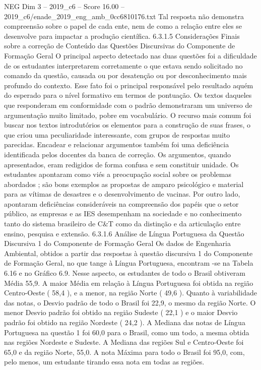 \begin{textsample}{NEG Dim 3 – 2019\_c6 – Score 16.00 – 2019\_c6/enade\_2019\_eng\_amb\_0cc6810176.txt}
Tal resposta não demonstra compreensão sobre o papel de cada ente, nem de como a relação entre eles se desenvolve para impactar a produção científica. 6.3.1.5 Considerações Finais sobre a correção de Conteúdo das Questões Discursivas do Componente de Formação Geral O principal aspecto detectado nas duas questões foi a dificuldade de os estudantes interpretarem corretamente o que estava sendo solicitado no comando da questão, causada ou por desatenção ou por desconhecimento mais profundo do contexto.
Esse fato foi o principal responsável pelo resultado aquém do esperado para o nível formativo em termos de pontuação.
Os textos daqueles que responderam em conformidade com o padrão demonstraram um universo de argumentação muito limitado, pobre em vocabulário.
O recurso mais comum foi buscar nos textos introdutórios os elementos para a construção de suas frases, o que criou uma peculiaridade interessante, com grupos de respostas muito parecidas.
Encadear e relacionar argumentos também foi uma deficiência identificada pelos docentes da banca de correção.
Os argumentos, quando apresentados, eram redigidos de forma confusa e sem constituir unidade.
Os estudantes apontaram como viés a preocupação social sobre os problemas abordados ; são bons exemplos as propostas de amparo psicológico e material para as vítimas de desastres e o desenvolvimento de vacinas.
Por outro lado, apontaram deficiências consideráveis na compreensão dos papéis que o setor público, as empresas e as IES desempenham na sociedade e no conhecimento tanto do sistema brasileiro de C\&T como da distinção e da articulação entre ensino, pesquisa e extensão. 6.3.1.6 Análise de Língua Portuguesa da Questão Discursiva 1 do Componente de Formação Geral Os dados de Engenharia Ambiental, obtidos a partir das respostas à questão discursiva 1 do Componente de Formação Geral, no que tange à Língua Portuguesa, encontram -se na Tabela 6.16 e no Gráfico 6.9.
Nesse aspecto, os estudantes de todo o Brasil obtiveram Média 55,9.
A maior Média em relação à Língua Portuguesa foi obtida na região Centro-Oeste ( 58,4 ), e a menor, na região Norte ( 49,6 ).
Quanto à variabilidade das notas, o Desvio padrão de todo o Brasil foi 22,9, o mesmo da região Norte.
O menor Desvio padrão foi obtido na região Sudeste ( 22,1 ) e o maior Desvio padrão foi obtido na região Nordeste ( 24,2 ).
A Mediana das notas de Língua Portuguesa na questão 1 foi 60,0 para o Brasil, como um todo, a mesma obtida nas regiões Nordeste e Sudeste.
A Mediana das regiões Sul e Centro-Oeste foi 65,0 e da região Norte, 55,0.
A nota Máxima para todo o Brasil foi 95,0, com, pelo menos, um estudante tirando essa nota em todas as regiões.

\end{textsample}
